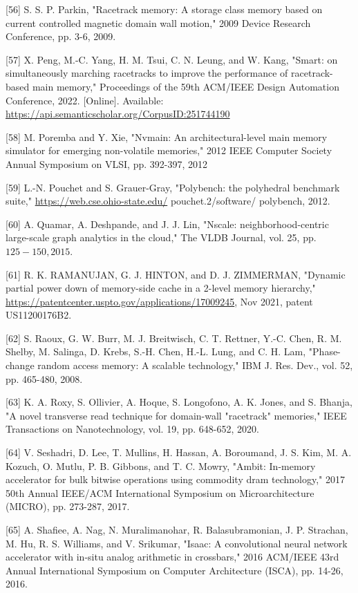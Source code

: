 \documentclass[10pt]{article}
\begin{document}
[56] S. S. P. Parkin, "Racetrack memory: A storage class memory based on current controlled magnetic domain wall motion," 2009 Device Research Conference, pp. 3-6, 2009.

[57] X. Peng, M.-C. Yang, H. M. Tsui, C. N. Leung, and W. Kang, "Smart: on simultaneously marching racetracks to improve the performance of racetrack-based main memory," Proceedings of the 59th ACM/IEEE Design Automation Conference, 2022. [Online]. Available: \href{https://api.semanticscholar.org/CorpusID:251744190}{https://api.semanticscholar.org/CorpusID:251744190}

[58] M. Poremba and Y. Xie, "Nvmain: An architectural-level main memory simulator for emerging non-volatile memories," 2012 IEEE Computer Society Annual Symposium on VLSI, pp. 392-397, 2012

[59] L.-N. Pouchet and S. Grauer-Gray, "Polybench: the polyhedral benchmark suite," \href{https://web.cse.ohio-state.edu/}{https://web.cse.ohio-state.edu/} pouchet.2/software/ polybench, 2012.

[60] A. Quamar, A. Deshpande, and J. J. Lin, "Nscale: neighborhood-centric large-scale graph analytics in the cloud," The VLDB Journal, vol. 25, pp. $125-150,2015$.

[61] R. K. RAMANUJAN, G. J. HINTON, and D. J. ZIMMERMAN, "Dynamic partial power down of memory-side cache in a 2-level memory hierarchy," \href{https://patentcenter.uspto.gov/applications/17009245}{https://patentcenter.uspto.gov/applications/17009245}, Nov 2021, patent US11200176B2.

[62] S. Raoux, G. W. Burr, M. J. Breitwisch, C. T. Rettner, Y.-C. Chen, R. M. Shelby, M. Salinga, D. Krebs, S.-H. Chen, H.-L. Lung, and C. H. Lam, "Phase-change random access memory: A scalable technology," IBM J. Res. Dev., vol. 52, pp. 465-480, 2008.

[63] K. A. Roxy, S. Ollivier, A. Hoque, S. Longofono, A. K. Jones, and S. Bhanja, "A novel transverse read technique for domain-wall "racetrack" memories," IEEE Transactions on Nanotechnology, vol. 19, pp. 648-652, 2020.

[64] V. Seshadri, D. Lee, T. Mullins, H. Hassan, A. Boroumand, J. S. Kim, M. A. Kozuch, O. Mutlu, P. B. Gibbons, and T. C. Mowry, "Ambit: In-memory accelerator for bulk bitwise operations using commodity dram technology," 2017 50th Annual IEEE/ACM International Symposium on Microarchitecture (MICRO), pp. 273-287, 2017.

[65] A. Shafiee, A. Nag, N. Muralimanohar, R. Balasubramonian, J. P. Strachan, M. Hu, R. S. Williams, and V. Srikumar, "Isaac: A convolutional neural network accelerator with in-situ analog arithmetic in crossbars," 2016 ACM/IEEE 43rd Annual International Symposium on Computer Architecture (ISCA), pp. 14-26, 2016.
\end{document}
